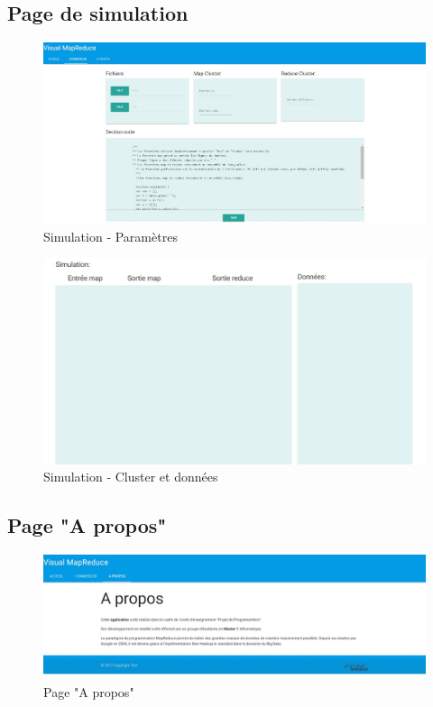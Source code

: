 \subsection{Page de simulation}
\begin{figure}[H]
  \centering
    \includegraphics[scale=0.5]{images/resultat_simulation_1.jpg}
        \caption{Simulation - Paramètres}
\end{figure}
\begin{figure}[H]
  \centering
    \includegraphics[scale=0.5]{images/resultat_simulation_2.jpg}
        \caption{Simulation - Cluster et données}
\end{figure}

\subsection{Page "A propos"}
\begin{figure}[H]
  \centering
    \includegraphics[scale=0.4]{images/apropos.jpg}
        \caption{Page "A propos"}
\end{figure}
